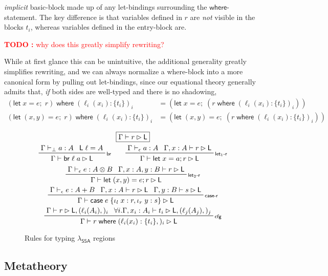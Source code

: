 \documentclass[acmsmall,screen,review]{acmart}
\newcounter{todos}
\newcommand{\TODO}[1]{{
  \stepcounter{todos}
  \begin{center}\large{\textcolor{red}{\textbf{TODO \arabic{todos}:} #1}}\end{center}
}}
\newcommand{\ms}[1]{\ensuremath{\mathsf{#1}}}
\newcommand{\lto}{:}
\newcommand{\linl}[1]{\iota_l\;{#1}}
\newcommand{\linr}[1]{\iota_r\;{#1}}
\newcommand{\letexpr}[3]{\ensuremath{\ms{let}\;#1 = #2;\;#3}}
\newcommand{\letstmt}[3]{\ensuremath{\ms{let}\;#1 = #2; #3}}
\newcommand{\brb}[2]{\ms{br}\;#1\;#2}
\newcommand{\casestmt}[5]{\ms{case}\;#1\;\{\linl{#2} \lto #3, \linr{#4} \lto #5\}}
\newcommand{\where}[2]{#1\;\ms{where}\;#2}
\newcommand{\wbranch}[3]{#1(#2) \lto \{#3\}}
\newcommand{\bhyp}[2]{#1 : #2}
\newcommand{\lhyp}[2]{#1(#2)}
\newcommand{\rle}[1]{{\scriptsize\textsf{#1}}}
\newcommand{\hasty}[4]{#1 \vdash_{#2} #3: {#4}}
\newcommand{\haslb}[3]{#1 \vdash #2 \rhd #3}
\newcommand{\isotopessa}{\(\lambda_{\ms{SSA}}\)}
\begin{document}
\emph{implicit} basic-block made up of any let-bindings surrounding the \ms{where}-statement. The
key difference is that variables defined in $r$ are \emph{not} visible in the blocks $t_i$, whereas
variables defined in the entry-block are. 
\TODO{why does this greatly simplify rewriting?}
While at first glance this can be unintuitive, the additional generality greatly simplifies
rewriting, and we can always normalize a where-block into a more canonical form by pulling out
let-bindings, since our equational theory generally admits that, \emph{if} both sides are well-typed
and there is no shadowing,
\begin{align*}
  \where{(\letexpr{x}{e}{r})}{(\wbranch{\ell_i}{x_i}{t_i})_i}
  &= (\letexpr{x}{e}{(\where{r}{(\wbranch{\ell_i}{x_i}{t_i})_i})}) \\
  \where{(\letexpr{(x, y)}{e}{r})}{(\wbranch{\ell_i}{x_i}{t_i})_i}
  &= (\letexpr{(x, y)}{e}{(\where{r}{(\wbranch{\ell_i}{x_i}{t_i})_i})})
\end{align*}

\begin{figure}
  \begin{gather*}
    \boxed{\haslb{\Gamma}{r}{\ms{L}}} \\
    \prftree[r]{\rle{br}}{\hasty{\Gamma}{\bot}{a}{A}}{\ms{L}\;\ell = A}
      {\haslb{\Gamma}{\brb{\ell}{a}}{\ms{L}}} \qquad
    \prftree[r]{\rle{let$_1$-r}}
      {\hasty{\Gamma}{\epsilon}{a}{A}}
      {\haslb{\Gamma, \bhyp{x}{A}}{r}{\ms{L}}}
      {\haslb{\Gamma}{\letstmt{x}{a}{r}}{\ms{L}}} \\
    \prftree[r]{\rle{let$_2$-r}}
      {\hasty{\Gamma}{\epsilon}{e}{A \otimes B}}
      {\haslb{\Gamma, \bhyp{x}{A}, \bhyp{y}{B}}{r}{\ms{L}}}
      {\haslb{\Gamma}{\letstmt{(x, y)}{e}{r}}{\ms{L}}} \\
    \prftree[r]{\rle{case-r}}
      {\hasty{\Gamma}{\epsilon}{e}{A + B}}
      {\haslb{\Gamma, \bhyp{x}{A}}{r}{\ms{L}}}
      {\haslb{\Gamma, \bhyp{y}{B}}{s}{\ms{L}}}
      {\haslb{\Gamma}{\casestmt{e}{x}{r}{y}{s}}{\ms{L}}} \\
    \prftree[r]{\rle{cfg}}
      {\haslb{\Gamma}{r}{\ms{L}, (\lhyp{\ell_i}{A_i},)_i}}
      {\forall i. \haslb{\Gamma, \bhyp{x_i}{A_i}}{t_i}{\ms{L}, (\lhyp{\ell_j}{A_j},)_j}}
      {\haslb{\Gamma}{\where{r}{(\wbranch{\ell_i}{x_i}{t_i},)_i}}{\ms{L}}}
  \end{gather*}
  \caption{Rules for typing \isotopessa{} regions}
  \Description{}
  \label{fig:ssa-reg-rules}
\end{figure}

\subsection{Metatheory}
\end{document}
